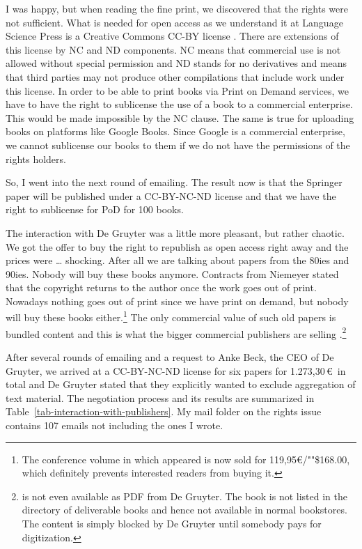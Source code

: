 \begin{refsection}
I was happy, but when reading the fine print, we discovered that the rights
were not sufficient. What is needed for open access as we understand it at Language Science Press is a Creative Commons
CC-BY license \citep{Shieber2012a}. There are extensions of this license by NC and ND components. NC
means that commercial use is not allowed without special permission and ND stands for no derivatives
and means that third parties may not produce other compilations that include work under this
license. In order to be able to print books via Print on Demand services, we have to have the right
to sublicense the use of a book to a commercial enterprise. This would be made impossible by the NC
clause. The same is true for uploading books on platforms like Google Books. Since Google is a
commercial enterprise, we cannot sublicense our books to them if we do not have the permissions of
the rights holders.

So, I went into the next round of emailing. The result now is that the Springer paper will be
published under a CC-BY-NC-ND license and that we have the right to sublicense for PoD for 100
books.

\addlines[1]
The interaction with De Gruyter was a little more pleasant, but rather chaotic. We got the offer to
buy the right to republish as open access right away and the prices were \ldots{} shocking. After all
we are talking about papers from the 80ies and 90ies. Nobody will buy these books anymore. Contracts
from Niemeyer stated that the copyright returns to the author once the work goes out of
print. Nowadays nothing goes out of print since we have print on demand, but nobody will buy these
books either.\footnote{%
  The conference volume in which  appeared is now sold for 119,95\euro{}/""\$168.00,
  which definitely prevents interested readers from buying it.%
}
The only commercial value
of such old papers is bundled content and this is what the bigger commercial publishers are
selling \citep{Shieber2013a}.\footnote{%
  is not even available as PDF from De Gruyter. The book is not listed in the directory of
 deliverable books and hence not available in normal bookstores. The content is simply blocked by De Gruyter until somebody pays for digitization.%
}

After several rounds of emailing and a request to Anke Beck, the CEO of De Gruyter, we arrived at a
CC-BY-NC-ND license for six papers for 1.273,30\,\euro\ in total and De Gruyter stated that they explicitly wanted to exclude aggregation of text
material. The negotiation process and its results are summarized in
Table~\ref{tab-interaction-with-publishers}. My mail folder on the rights issue contains 107
emails not including the ones I wrote.


\end{refsection}
